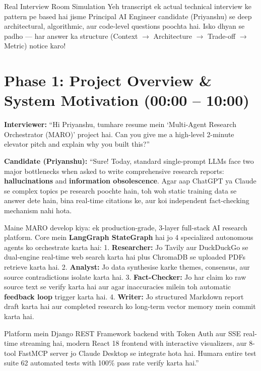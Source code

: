 \documentclass[11pt,a4paper,twoside]{report}
\begin{document}
\begin{storybox}{Real Interview Room Simulation}
Yeh transcript ek actual technical interview ke pattern pe based hai jisme Principal AI Engineer candidate (Priyanshu) se deep architectural, algorithmic, aur code-level questions poochta hai.
Isko dhyan se padho --- har answer ka structure (Context $\rightarrow$ Architecture $\rightarrow$ Trade-off $\rightarrow$ Metric) notice karo!
\end{storybox}

\section{Phase 1: Project Overview \& System Motivation (00:00 -- 10:00)}

\textbf{Interviewer:} ``Hi Priyanshu, tumhare resume mein `Multi-Agent Research Orchestrator (MARO)' project hai. Can you give me a high-level 2-minute elevator pitch and explain why you built this?''

\textbf{Candidate (Priyanshu):} ``Sure! Today, standard single-prompt LLMs face two major bottlenecks when asked to write comprehensive research reports: \textbf{hallucinations} and \textbf{information obsolescence}. Agar aap ChatGPT ya Claude se complex topics pe research poochte hain, toh woh static training data se answer dete hain, bina real-time citations ke, aur koi independent fact-checking mechanism nahi hota.

Maine MARO develop kiya: ek production-grade, 3-layer full-stack AI research platform.
Core mein \textbf{LangGraph StateGraph} hai jo 4 specialized autonomous agents ko orchestrate karta hai:
1. \textbf{Researcher:} Jo Tavily aur DuckDuckGo se dual-engine real-time web search karta hai plus ChromaDB se uploaded PDFs retrieve karta hai.
2. \textbf{Analyst:} Jo data synthesise karke themes, consensus, aur source contradictions isolate karta hai.
3. \textbf{Fact-Checker:} Jo har claim ko raw source text se verify karta hai aur agar inaccuracies milein toh automatic \textbf{feedback loop} trigger karta hai.
4. \textbf{Writer:} Jo structured Markdown report draft karta hai aur completed research ko long-term vector memory mein commit karta hai.

Platform mein Django REST Framework backend with Token Auth aur SSE real-time streaming hai, modern React 18 frontend with interactive visualizers, aur 8-tool FastMCP server jo Claude Desktop se integrate hota hai. Humara entire test suite 62 automated tests with 100\% pass rate verify karta hai.''
\end{document}

